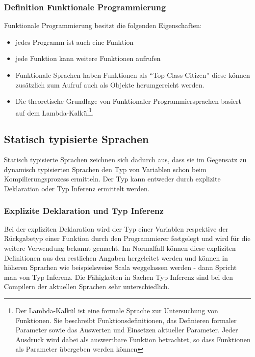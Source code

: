 \subsubsection{Definition Funktionale Programmierung}
Funktionale Programmierung besitzt die folgenden Eigenschaften:
\begin{itemize}
\item jedes Programm ist auch eine Funktion
\item jede Funktion kann weitere Funktionen aufrufen
\item Funktionale Sprachen haben Funktionen als ``Top-Class-Citizen''  diese k\"onnen zus\"atzlich zum Aufruf auch als Objekte herumgereicht werden.
\item Die theoretische Grundlage von Funktionaler Programmiersprachen basiert auf dem Lambda-Kalk\"ul\footnote{Der Lambda-Kalk\"ul ist eine formale Sprache zur Untersuchung von Funktionen. Sie beschreibt Funktionsdefinitionen, das Definieren formaler Parameter sowie das Auswerten und Einsetzen aktueller Parameter. Jeder Ausdruck wird dabei als auswertbare Funktion betrachtet, so dass Funktionen als Parameter \"ubergeben werden k\"onnen\cite{wiki:lambdakalkuel}}.
\end{itemize}





\subsection{Statisch typisierte Sprachen}
Statisch typisierte Sprachen zeichnen sich dadurch aus, dass sie im Gegensatz zu dynamisch typisierten Sprachen den Typ von Variablen schon beim Kompilierungsprozess ermitteln. Der Typ kann entweder durch explizite Deklaration oder Typ Inferenz ermittelt werden.

\subsubsection{Explizite Deklaration und Typ Inferenz}
Bei der expliziten Deklaration wird der Typ einer Variablen respektive der R\"uckgabetyp einer Funktion durch den Programmierer festgelegt und wird f\"ur die weitere Verwendung bekannt gemacht. Im Normalfall k\"onnen diese expliziten Definitionen aus den restlichen Angaben hergeleitet werden und k\"onnen in h\"oheren Sprachen wie beispielsweise Scala weggelassen werden - dann Spricht man von Typ Inferenz. Die F\"ahigkeiten in Sachen Typ Inferenz sind bei den Compilern der aktuellen Sprachen sehr unterschiedlich.

